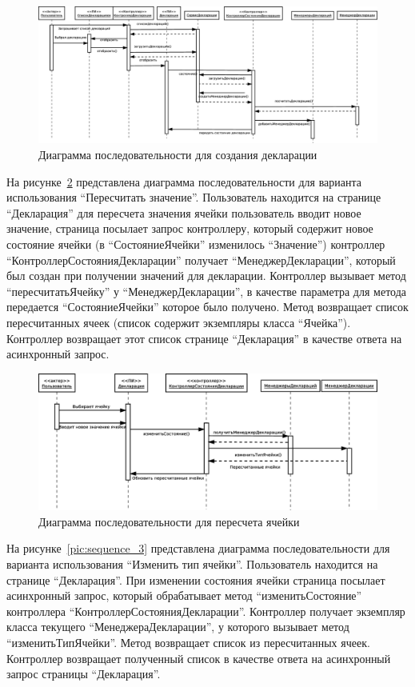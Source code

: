 \documentclass[14pt,a4paper]{reportmod}
\begin{document}
\begin{figure}
  \centering
  \includegraphics[scale=0.35]{uml/sequence_1}
  \caption{Диаграмма последовательности для создания декларации}
  \label{pic:sequnce_1}
\end{figure}
На рисунке~\ref{pic:sequence_2} представлена диаграмма последовательности для варианта использования ``Пересчитать значение''. Пользователь находится на странице ``Декларация'' для пересчета значения ячейки пользователь вводит новое значение, страница посылает запрос контроллеру, который содержит новое состояние ячейки (в ``СостояниеЯчейки'' изменилось ``Значение'') контроллер ``КонтроллерСостоянияДекларации'' получает ``МенеджерДекларации'', который был создан при получении значений для декларации. Контроллер вызывает метод ``пересчитатьЯчейку'' у ``МенеджерДекларации'', в качестве параметра для метода передается ``СостояниеЯчейки'' которое было получено. Метод возвращает список пересчитанных ячеек (список содержит экземпляры класса ``Ячейка''). Контроллер возвращает этот список странице ``Декларация'' в качестве ответа на асинхронный запрос.

\begin{figure}
  \centering
  \includegraphics[scale=0.4]{uml/sequence_2}
  \caption{Диаграмма последовательности для пересчета ячейки}
  \label{pic:sequence_2}
\end{figure}

На рисунке~\ref{pic:sequence_3} представлена диаграмма последовательности для варианта использования ``Изменить тип ячейки''. Пользователь находится на странице ``Декларация''. При изменении состояния ячейки страница посылает асинхронный запрос, который обрабатывает метод ``изменитьСостояние'' контроллера ``КонтроллерСостоянияДекларации''. Контроллер получает экземпляр класса текущего ``МенеджераДекларации'', у которого вызывает метод ``изменитьТипЯчейки''. Метод возвращает список из пересчитанных ячеек. Контроллер возвращает полученный список в качестве ответа на асинхронный запрос страницы ``Декларация''.
\end{document}

